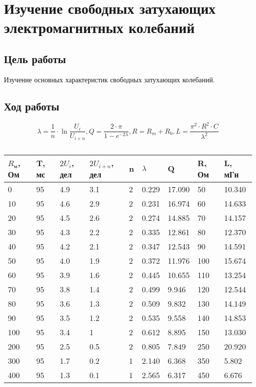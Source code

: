 \chapter{Изучение свободных затухающих электромагнитных колебаний}

\section{Цель работы}

Изучение основных характеристик свободных затухающих колебаний.

\section{Ход работы}

\[
\lambda=\frac{1}{n}\cdot \ln\frac{U_i}{U_{i+n}}, Q = \frac{2\cdot \pi}{1-e^{-2 \lambda}}, R=R_m + R_0, L = \frac{\pi^2 \cdot R^2 \cdot C}{\lambda ^ 2}
\]

\begin{table}[h]
	\caption{}
	\begin{tabularx}{\textwidth}{|X|X|X|X|X|X|X|X|X|}
		\hline 
		$R_\text{м}$, Ом & T, мс & $2U_i$, дел & $2U_{i+n}$, дел & n & $\lambda$ & Q & R, Ом & L, мГн \\ 
		\hline 
		0 & 95  & 4.9  & 3.1  & 2 & 0.229 & 17.090 & 50 & 10.340  \\ 
		\hline 
		10 & 95  & 4.6 & 2.9 & 2 & 0.231 & 16.974 & 60 & 14.633  \\ 
		\hline 
		20 & 95 & 4.5  & 2.6  & 2  & 0.274 & 14.885 &  70 & 14.157 \\ 
		\hline 
		30 & 95  & 4.3 & 2.2 & 2 & 0.335 & 12.861 & 80 & 12.370 \\ 
		\hline 
		40 & 95 & 4.2 & 2.1 & 2  & 0.347  & 12.543 & 90 & 14.591  \\ 
		\hline 
		50 & 95 & 4.0 & 1.9 & 2 & 0.372  & 11.976 & 100 & 15.674 \\ 
		\hline 
		60 & 95 & 3.9 & 1.6 & 2 & 0.445 & 10.655 & 110  & 13.254  \\ 
		\hline 
		70 & 95 & 3.8 & 1.4 & 2 & 0.499 & 9.946 & 120  & 12.544  \\ 
		\hline 
		80 & 95 & 3.6 & 1.3 & 2 & 0.509 & 9.832 & 130  & 14.149  \\ 
		\hline 
		90 & 95 & 3.5 & 1.2 & 2 & 0.535 & 9.558 & 140 & 14.853 \\ 
		\hline 
		100 & 95 & 3.4 & 1 & 2 & 0.612 & 8.895 & 150 & 13.030  \\ 
		\hline 
		200 & 95 & 2.5 & 0.5 & 2  & 0.805 & 7.849 & 250  & 20.920  \\ 
		\hline 
		300 & 95 & 1.7 & 0.2 & 1 & 2.140 & 6.368 & 350 & 5.802  \\ 
		\hline 
		400 & 95 & 1.3 & 0.1 & 1 & 2.565 & 6.317 & 450 & 6.676 \\ 
		\hline 
	\end{tabularx} 
\end{table}

